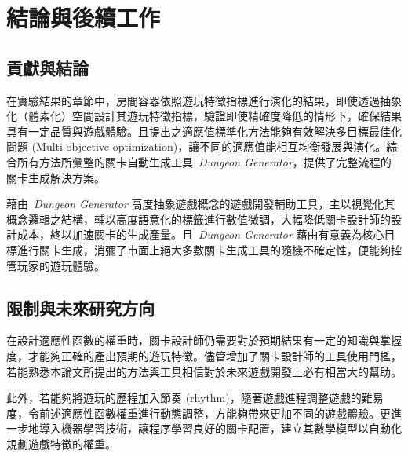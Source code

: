 \chapter{結論與後續工作}
\label{cha:conclusions}

\section{貢獻與結論}

在實驗結果的章節中，房間容器依照遊玩特徵指標進行演化的結果，即使透過抽象化（體素化）空間設計其遊玩特徵指標，驗證即使精確度降低的情形下，確保結果具有一定品質與遊戲體驗。且提出之適應值標準化方法能夠有效解決多目標最佳化問題 (Multi-objective optimization)，讓不同的適應值能相互均衡發展與演化。綜合所有方法所彙整的關卡自動生成工具~\textit{Dungeon Generator}，提供了完整流程的關卡生成解決方案。


藉由~\textit{Dungeon Generator} 高度抽象遊戲概念的遊戲開發輔助工具，主以視覺化其概念邏輯之結構，輔以高度語意化的標籤進行數值微調，大幅降低關卡設計師的設計成本，終以加速關卡的生成產量。且~\textit{Dungeon Generator} 藉由有意義為核心目標進行關卡生成，消彌了市面上絕大多數關卡生成工具的隨機不確定性，便能夠控管玩家的遊玩體驗。

\section{限制與未來研究方向} 

在設計適應性函數的權重時，關卡設計師仍需要對於預期結果有一定的知識與掌握度，才能夠正確的產出預期的遊玩特徵。儘管增加了關卡設計師的工具使用門檻，若能熟悉本論文所提出的方法與工具相信對於未來遊戲開發上必有相當大的幫助。

此外，若能夠將遊玩的歷程加入節奏 (rhythm)，隨著遊戲進程調整遊戲的難易度，令前述適應性函數權重進行動態調整，方能夠帶來更加不同的遊戲體驗。更進一步地導入機器學習技術，讓程序學習良好的關卡配置，建立其數學模型以自動化規劃遊戲特徵的權重。
